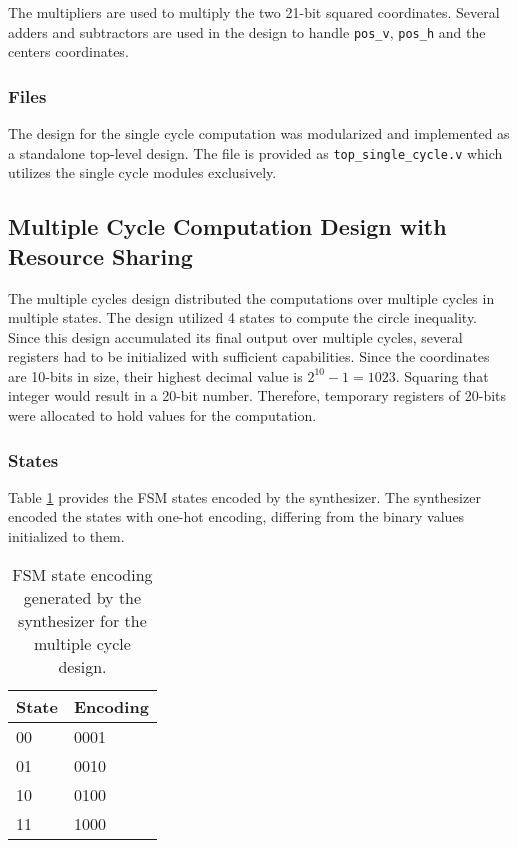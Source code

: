 \documentclass[paper=usletter, fontsize=12pt]{article}
\begin{document}
        The multipliers are used to multiply the two 21-bit squared
        coordinates. Several adders and subtractors are used in the design to
        handle \texttt{pos\_v}, \texttt{pos\_h} and the centers coordinates.
        \newpage

        \subsubsection{Files} The design for the single cycle computation was
        modularized and implemented as a standalone top-level design. The file
        is provided as \texttt{top\_single\_cycle.v} which utilizes the single
        cycle modules exclusively.

        \subsection{Multiple Cycle Computation Design with Resource Sharing}
        The multiple cycles design distributed the computations over multiple
        cycles in multiple states. The design utilized 4 states to compute the
        circle inequality. Since this design accumulated its final output over
        multiple cycles, several registers had to be initialized with
        sufficient capabilities. Since the coordinates are 10-bits in size,
        their highest decimal value is $2^10-1=1023$. Squaring that integer
        would result in a 20-bit number. Therefore, temporary registers of
        20-bits were allocated to hold values for the computation.

        \subsubsection{States} Table \ref{table:multifsmcode} provides the FSM
        states encoded by the synthesizer. The synthesizer encoded the states
        with one-hot encoding, differing from the binary values initialized to
        them.

        \begin{table}[h]
            \caption{FSM state encoding generated by the synthesizer for the
            multiple cycle design.}
            \label{table:multifsmcode}
            \centering
            \begin{tabular}{ m{5em}m{5em} }
                \hline
                \textbf{State}  &   \textbf{Encoding} \\
                \hline
                00              &   0001 \\
                01              &   0010 \\
                10              &   0100 \\
                11              &   1000 \\
                \hline
            \end{tabular}
        \end{table}
\end{document}
